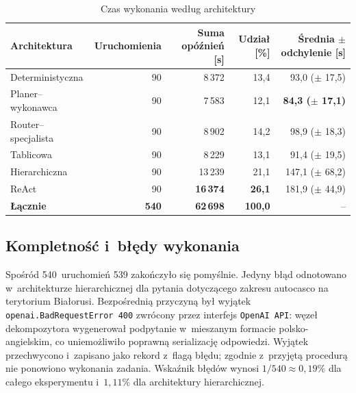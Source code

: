 \begin{table}[H]
  \caption{Czas wykonania według architektury}\label{tab:czas-wykonania}
  \centering
  \small
  \renewcommand{\arraystretch}{1.3}
  \begin{tabular}{@{} l r r r r @{}}
    \toprule
    \textbf{Architektura}
    & \textbf{Uruchomienia}
    & \textbf{Suma opóźnień [s]}
    & \textbf{Udział [\%]}
    & \textbf{Średnia \(\pm\) odchylenie [s]}                                                                          \\
    \midrule
    Deterministyczna    & 90                                      & 8\,372           & 13{,}4           & 93{,}0 (\(\pm\) 17{,}5)          \\
    Planer--wykonawca   & 90                                      & 7\,583           & 12{,}1           & \textbf{84{,}3 (\(\pm\) 17{,}1)} \\
    Router--specjalista & 90                                      & 8\,902           & 14{,}2           & 98{,}9 (\(\pm\) 18{,}3)          \\
    Tablicowa           & 90                                      & 8\,229           & 13{,}1           & 91{,}4 (\(\pm\) 19{,}5)          \\
    Hierarchiczna       & 90                                      & 13\,239          & 21{,}1           & 147{,}1 (\(\pm\) 68{,}2)         \\
    ReAct               & 90                                      & \textbf{16\,374} & \textbf{26{,}1}  & 181{,}9 (\(\pm\) 44{,}9)         \\
    \midrule
    \textbf{Łącznie}    & \textbf{540}                            & \textbf{62\,698} & \textbf{100{,}0} & --                               \\
    \bottomrule
  \end{tabular}
\end{table}

\subsection{Kompletność i~błędy wykonania}\label{subsec:kompletnosc-i-bledy}

Spośród 540~uruchomień 539 zakończyło się pomyślnie. Jedyny błąd odnotowano
w~architekturze hierarchicznej dla pytania dotyczącego zakresu autocasco na
terytorium Białorusi. Bezpośrednią przyczyną był wyjątek
\texttt{openai.BadRequestError~400} zwrócony przez interfejs \texttt{OpenAI
API}: węzeł dekompozytora wygenerował podpytanie w~mieszanym formacie
polsko-angielskim, co uniemożliwiło poprawną serializację odpowiedzi. Wyjątek
przechwycono i~zapisano jako rekord z~flagą błędu; zgodnie z~przyjętą procedurą
nie ponowiono wykonania zadania. Wskaźnik błędów wynosi \(1/540 \approx
0{,}19\%\) dla całego eksperymentu i~\(1{,}11\%\) dla architektury
hierarchicznej.


